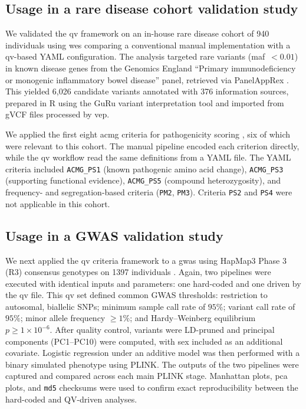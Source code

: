 \subsection{Usage in a rare disease cohort validation study}

We validated the \ac{qv} framework on an in-house rare disease cohort of 940 individuals using \ac{wes} comparing a conventional manual implementation with a \ac{qv}-based YAML configuration. The analysis targeted rare variants (\ac{maf}~$<0.01$) in known disease genes from the Genomics England ``Primary immunodeficiency or monogenic inflammatory bowel disease'' panel, retrieved via PanelAppRex \cite{lawless_panelapprex_2025}. This yielded 6{,}026 candidate variants annotated with 376 information sources, prepared in R using the GuRu variant interpretation tool and imported from gVCF files processed by \ac{vep}.

We applied the first eight \ac{acmg} criteria for pathogenicity scoring \cite{richards2015standards}, six of which were relevant to this cohort. The manual pipeline encoded each criterion directly, while the \ac{qv} workflow read the same definitions from a YAML file. %
The YAML criteria included \texttt{ACMG\_PS1} (known pathogenic amino acid change), \texttt{ACMG\_PS3} (supporting functional evidence), \texttt{ACMG\_PS5} (compound heterozygosity), and frequency- and segregation-based criteria (\texttt{PM2}, \texttt{PM3}). Criteria \texttt{PS2} and \texttt{PS4} were not applicable in this cohort.

\subsection{Usage in a GWAS validation study}
We next applied the \ac{qv} criteria framework to a \ac{gwas} using HapMap3 Phase 3 (R3) consensus genotypes on 1397 individuals \cite{2020fairleyInternationalGenomeSample}. Again, two pipelines were executed with identical inputs and parameters: one hard-coded and one driven by the \ac{qv}  file.
This \ac{qv}  set defined common GWAS thresholds: restriction to autosomal, biallelic SNPs; minimum sample call rate of $95\%$; variant call rate of $95\%$; minor allele frequency $\geq 1\%$; and Hardy–Weinberg equilibrium $p \geq 1\times10^{-6}$. After quality control, variants were LD-pruned and principal components (PC1–PC10) were computed, with sex included as an additional covariate. Logistic regression under an additive model was then performed with a binary simulated phenotype using PLINK.
The outputs of the two pipelines were captured and compared across each main PLINK stage. Manhattan plots, \ac{pca} plots, and \texttt{md5} checksums were used to confirm exact reproducibility between the hard-coded and QV-driven analyses.

